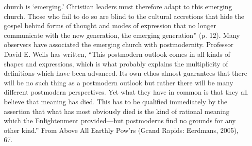 \begin{notelist}
  church is ‘emerging.’ Christian leaders must therefore adapt to this emerging church. Those who
  fail to do so are blind to the cultural accretions that hide the gospel behind forms of thought
  and modes of expression that no longer communicate with the new generation, the emerging
  generation” (p. 12). Many observers have associated the emerging church with postmodernity.
\entry Professor David E. Wells has written, “This postmodern outlook comes in all kinds of shapes
  and expressions, which is what probably explains the multiplicity of definitions which have been
  advanced. Its own ethos almost guarantees that there will be no such thing as a postmodern outlook
  but rather there will be many different postmodern perspectives. Yet what they have in common is
  that they all believe that meaning has died. This has to be qualified immediately by the assertion
  that what has most obviously died is the kind of rational meaning which the Enlightenment
  provided—but postmoderns find no grounds for any other kind.” From Above All Earthly Pow’rs (Grand
  Rapids: Eerdmans, 2005), 67.
\end{notelist}

